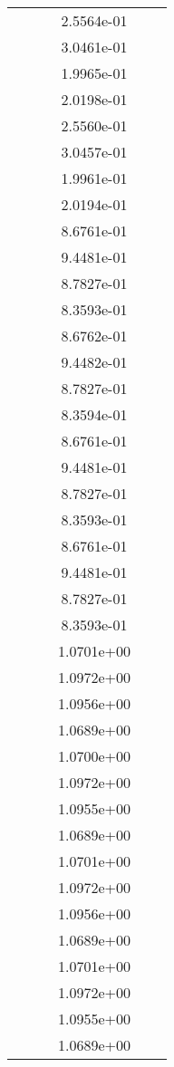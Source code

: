 \begin{xltabular}{\textwidth}{r|rS[table-format=1.3e+2]S[table-format=1.4e+2]S[table-format=1.4e+2]S[table-format=-1.5]}
&  &  & 2.5564e-01 & & \\
&  &  & 3.0461e-01 & & \\
&  &  & 1.9965e-01 & & \\
&  &  & 2.0198e-01 & & \\
&  &  & 2.5560e-01 & & \\
&  &  & 3.0457e-01 & & \\
&  &  & 1.9961e-01 & & \\
&  &  & 2.0194e-01 & & \\
&  &  & 8.6761e-01 & & \\
&  &  & 9.4481e-01 & & \\
&  &  & 8.7827e-01 & & \\
&  &  & 8.3593e-01 & & \\
&  &  & 8.6762e-01 & & \\
&  &  & 9.4482e-01 & & \\
&  &  & 8.7827e-01 & & \\
&  &  & 8.3594e-01 & & \\
&  &  & 8.6761e-01 & & \\
&  &  & 9.4481e-01 & & \\
&  &  & 8.7827e-01 & & \\
&  &  & 8.3593e-01 & & \\
&  &  & 8.6761e-01 & & \\
&  &  & 9.4481e-01 & & \\
&  &  & 8.7827e-01 & & \\
&  &  & 8.3593e-01 & & \\
&  &  & 1.0701e+00 & & \\
&  &  & 1.0972e+00 & & \\
&  &  & 1.0956e+00 & & \\
&  &  & 1.0689e+00 & & \\
&  &  & 1.0700e+00 & & \\
&  &  & 1.0972e+00 & & \\
&  &  & 1.0955e+00 & & \\
&  &  & 1.0689e+00 & & \\
&  &  & 1.0701e+00 & & \\
&  &  & 1.0972e+00 & & \\
&  &  & 1.0956e+00 & & \\
&  &  & 1.0689e+00 & & \\
&  &  & 1.0701e+00 & & \\
&  &  & 1.0972e+00 & & \\
&  &  & 1.0955e+00 & & \\
&  &  & 1.0689e+00 & & \\

\end{xltabular}
